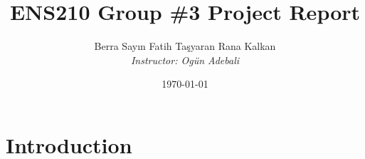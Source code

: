 \documentclass[a4paper]{article}
\begin{document}
\title{\textbf{\huge{ENS210 Group \#3 Project Report}}}
\author{\textbf\large{Berra Say{\i}n \vspace{3ex} Fatih Ta\c{s}yaran \vspace{3ex} Rana Kalkan} \\ \vspace{-4ex} \textit{Instructor: Ogün Adebali}}
\date{\today}
\maketitle

\section{Introduction}
\end{document}
